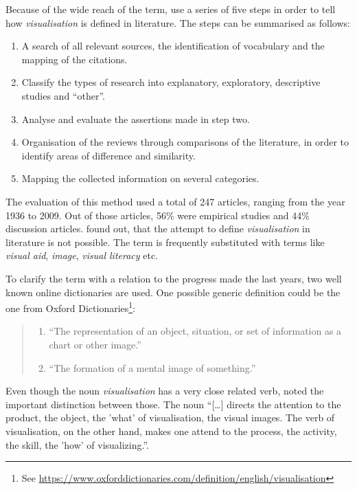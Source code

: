 Because of the wide reach of the term, \citeauthor{Phillips2010} use a series of five steps in order to tell how \textit{visualisation} is defined in literature. The steps can be summarised as follows:
\begin{enumerate}
\item A search of all relevant sources, the identification of vocabulary and the mapping of the citations.
\item Classify the types of research into explanatory, exploratory, descriptive studies and ``other''.
\item Analyse and evaluate the assertions made in step two.
\item Organisation of the reviews through comparisons of the literature, in order to identify areas of difference and similarity.
\item Mapping the collected information on several categories.
\end{enumerate}
The evaluation of this method used a total of 247 articles, ranging from the year 1936 to 2009. Out of those articles, 56\% were empirical studies and 44\% discussion articles. \citeauthor{Phillips2010} found out, that the attempt to define \textit{visualisation} in literature is not possible. The term is frequently substituted with terms like \textit{visual aid}, \textit{image}, \textit{visual literacy} etc.

To clarify the term with a relation to the progress made the last years, two well known online dictionaries are used. One possible generic definition could be the one from Oxford Dictionaries\footnote{See \href{https://www.oxforddictionaries.com/definition/english/visualisation}{https://www.oxforddictionaries.com/definition/english/visualisation}}:

\begin{quote}
\begin{enumerate}
\item ``The representation of an object, situation, or set of information as a chart or other image.''
\item ``The formation of a mental image of something.''
\end{enumerate}
\end{quote}

Even though the noun \textit{visualisation} has a very close related verb, \citeauthor{Phillips2010} noted the important distinction between those. The noun ``[\ldots] directs the attention to the product, the object, the 'what' of visualisation, the visual images. The verb of visualisation, on the other hand, makes one attend to the process, the activity, the skill, the 'how' of visualizing.''.

